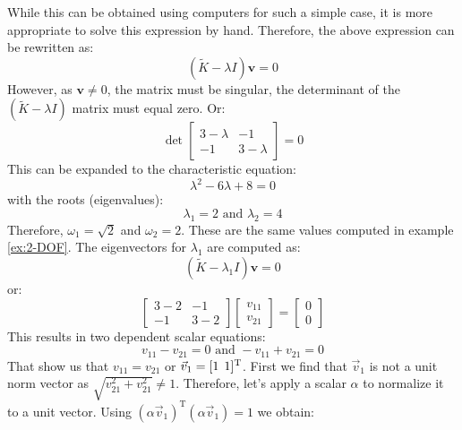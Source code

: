 \documentclass[12pt,letter]{article}
\begin{document}
\begin{example}
While this can be obtained using computers for such a simple case, it is more appropriate to solve this expression by hand. Therefore, the above expression can be rewritten as:
\begin{equation}
(\widetilde{K} - \lambda I)\textbf{v} =  0
\end{equation}
However, as $\textbf{v} \neq 0$, the matrix must be singular, the determinant of the $(\widetilde{K} - \lambda I)$ matrix must equal zero. Or:
\begin{equation}
\det \begin{bmatrix} 3-\lambda & -1 \\    -1  & 3-\lambda \end{bmatrix}  =  0
\end{equation}
This can be expanded to the characteristic equation:
\begin{equation}
\lambda^2 -6\lambda + 8  =  0
\end{equation}
with the roots (eigenvalues):
\begin{equation}
\lambda_1 = 2\text{ and } \lambda_2 = 4
\end{equation}
Therefore, $\omega_1=\sqrt{2}$ and $\omega_2=2$. These are the same values computed in example \ref{ex:2-DOF}. The eigenvectors for $\lambda_1$ are computed as:
\begin{equation}
(\widetilde{K} - \lambda_1 I)\textbf{v} =  0
\end{equation}
or:
\begin{equation}
\begin{bmatrix} 3-2 & -1 \\    -1  & 3-2 \end{bmatrix} \begin{bmatrix} v_{11} \\ v_{21}  \end{bmatrix} =  \begin{bmatrix} 0 \\ 0  \end{bmatrix}
\end{equation}
This results in two dependent scalar equations:
\begin{equation}
v_{11} - v_{21} = 0 \text{ and } -v_{11} + v_{21} =0
\end{equation}
That show us that $v_{11} = v_{21}$ or $\vec{v}_1=[1 \hspace{1ex} 1]^\text{T}$. First we find that $\vec{v}_1$ is not a unit norm vector as $\sqrt{v_{21}^2+v_{21}^2}\ne1$. Therefore, let's apply a scalar $\alpha$ to normalize it to a unit vector. Using $(\alpha \vec{v}_1)^\text{T}(\alpha \vec{v}_1) = 1$ we obtain:

\end{example}
\end{document}
